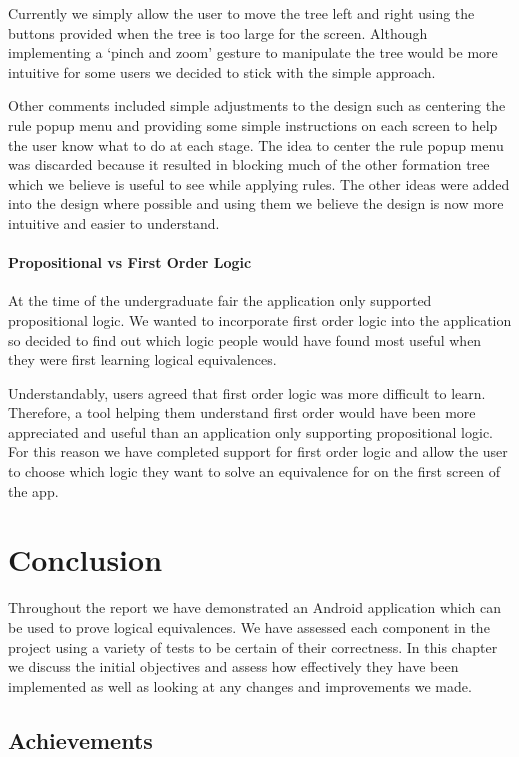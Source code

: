 \documentclass[draft]{report}
\begin{document}
Currently we simply allow the user to move the tree left and right using the buttons provided when the tree is too large for the screen. Although implementing a `pinch and zoom' gesture to manipulate the tree would be more intuitive for some users we decided to stick with the simple approach.

Other comments included simple adjustments to the design such as centering the rule popup menu and providing some simple instructions on each screen to help the user know what to do at each stage. The idea to center the rule popup menu was discarded because it resulted in blocking much of the other formation tree which we believe is useful to see while applying rules. The other ideas were added into the design where possible and using them we believe the design is now more intuitive and easier to understand.

\subsubsection{Propositional vs First Order Logic}

At the time of the undergraduate fair the application only supported propositional logic. We wanted to incorporate first order logic into the application so decided to find out which logic people would have found most useful when they were first learning logical equivalences.

Understandably, users agreed that first order logic was more difficult to learn. Therefore, a tool helping them understand first order would have been more appreciated and useful than an application only supporting propositional logic. For this reason we have completed support for first order logic and allow the user to choose which logic they want to solve an equivalence for on the first screen of the app.

\chapter{Conclusion}

Throughout the report we have demonstrated an Android application which can be used to prove logical equivalences. We have assessed each component in the project using a variety of tests to be certain of their correctness. In this chapter we discuss the initial objectives and assess how effectively they have been implemented as well as looking at any changes and improvements we made.

\section{Achievements}
\end{document}
